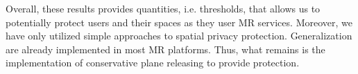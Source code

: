 Overall, these results provides quantities, i.e. thresholds, that allows us to potentially protect users and their spaces as they user MR services. Moreover, we have only utilized simple approaches to spatial privacy protection. Generalization are already implemented in most MR platforms. Thus, what remains is the implementation of conservative plane releasing to provide protection.
